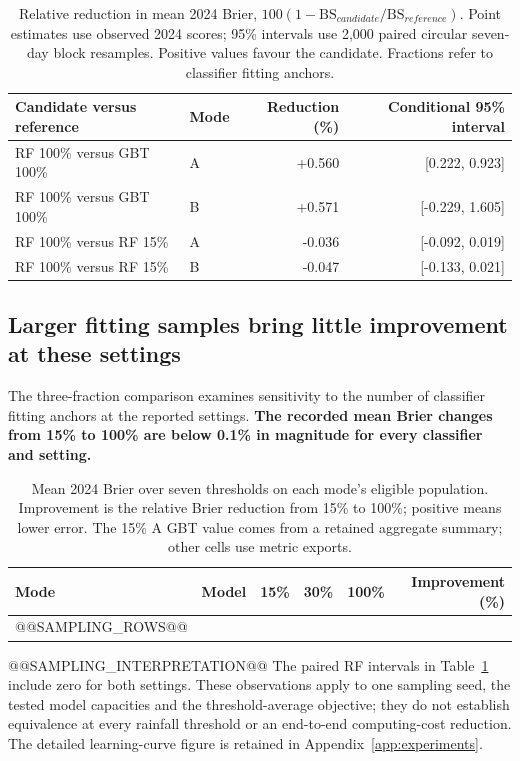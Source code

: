 \begin{table}[htbp]\centering\small
\begin{tabular}{llrr}\toprule
Candidate versus reference & Mode & Reduction (\%) & Conditional 95\% interval\\\midrule
RF 100\% versus GBT 100\% & A & +0.560 & [0.222, 0.923] \\
RF 100\% versus GBT 100\% & B & +0.571 & [-0.229, 1.605] \\
RF 100\% versus RF 15\% & A & -0.036 & [-0.092, 0.019] \\
RF 100\% versus RF 15\% & B & -0.047 & [-0.133, 0.021] \\
\bottomrule\end{tabular}
\caption{Relative reduction in mean 2024 Brier, $100(1-\mathrm{BS}_{candidate}/\mathrm{BS}_{reference})$. Point estimates use observed 2024 scores; 95\% intervals use 2,000 paired circular seven-day block resamples. Positive values favour the candidate. Fractions refer to classifier fitting anchors.}\label{tab:pairedmodels}
\end{table}

\FloatBarrier
\subsection{Larger fitting samples bring little improvement at these settings}
The three-fraction comparison examines sensitivity to the number of classifier fitting anchors at the reported settings. \textbf{The recorded mean Brier changes from 15\% to 100\% are below 0.1\% in magnitude for every classifier and setting.}
\begin{table}[!ht]\centering\small
\begin{tabular}{llrrrr}\toprule
Mode & Model & 15\% & 30\% & 100\% & Improvement (\%)\\\midrule
@@SAMPLING_ROWS@@
\bottomrule\end{tabular}
\caption{Mean 2024 Brier over seven thresholds on each mode's eligible population. Improvement is the relative Brier reduction from 15\% to 100\%; positive means lower error. The 15\% A GBT value comes from a retained aggregate summary; other cells use metric exports.}\label{tab:trainingsampling}
\end{table}
@@SAMPLING_INTERPRETATION@@ The paired RF intervals in Table~\ref{tab:pairedmodels} include zero for both settings. These observations apply to one sampling seed, the tested model capacities and the threshold-average objective; they do not establish equivalence at every rainfall threshold or an end-to-end computing-cost reduction. The detailed learning-curve figure is retained in Appendix~\ref{app:experiments}.


